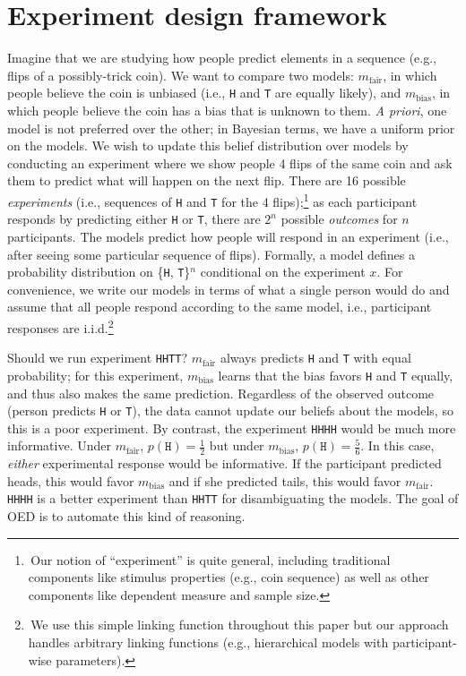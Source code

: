 \documentclass[10pt,letterpaper]{article}
\begin{document}
\section{Experiment design framework}
\label{s:bayes}
Imagine that we are studying how people predict elements in a sequence (e.g., flips of a possibly-trick coin).
We want to compare two models: $m_{\text{fair}}$, in which people believe the coin is unbiased (i.e.,  \lstinline{H} and  \lstinline{T} are equally likely), and $m_{\text{bias}}$, in which people believe the coin has a bias that is unknown  to them.
\emph{A priori}, one model is not preferred over the other; in Bayesian terms, we have a uniform prior on the models.
We wish to update this belief distribution over models by conducting an experiment where we show people 4 flips of the same coin and ask them to predict what will happen on the next flip.
There are 16 possible \emph{experiments} (i.e., sequences of \lstinline{H} and \lstinline{T} for the 4 flips);\footnote{\,Our notion of ``experiment'' is quite general, including traditional components like stimulus properties (e.g., coin sequence) as well as other components like dependent measure and sample size.} as each participant responds by predicting either \lstinline{H} or \lstinline{T}, there are $2^n$ possible \emph{outcomes} for $n$ participants.
The models predict how people will respond in an experiment (i.e., after seeing some particular sequence of flips).
Formally, a model defines a probability distribution on \{\lstinline{H}, \lstinline{T}\}$^n$ conditional on the experiment $x$.
For convenience, we write our models in terms of what a single person would do and assume that all people respond according to the same model, i.e., participant responses are i.i.d.\footnote{\,We use this simple linking function throughout this paper but our approach handles arbitrary linking functions (e.g., hierarchical models with participant-wise parameters).}

Should we run experiment \lstinline{HHTT}?
$m_{\text{fair}}$ always predicts \lstinline{H} and \lstinline{T} with equal probability; for this experiment, $m_{\text{bias}}$ learns that the bias favors \lstinline{H} and \lstinline{T} equally, and thus also makes the same prediction. 
Regardless of the observed outcome (person predicts \lstinline{H} or \lstinline{T}), the data cannot update our beliefs about the models, so this is a poor experiment.
By contrast, the experiment \lstinline{HHHH} would be much more informative.
Under $m_{\text{fair}}$, $p(\texttt{H}) = \frac{1}{2}$ but under $m_{\text{bias}}$, $p(\texttt{H}) = \frac{5}{6}$.
In this case, \emph{either} experimental response would be informative.
If the participant predicted heads, this would favor $m_{\text{bias}}$ and if she predicted tails, this would favor $m_{\text{fair}}$.
\lstinline{HHHH} is a better experiment than \lstinline{HHTT} for disambiguating the models.
The goal of OED is to automate this kind of reasoning.
\end{document}
